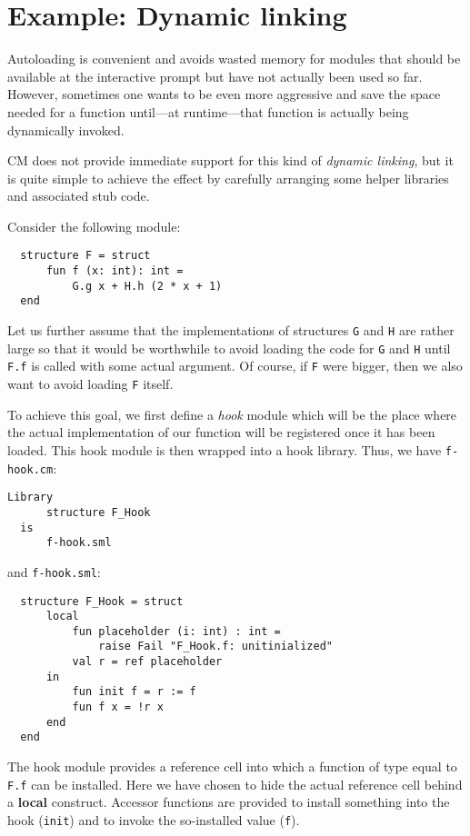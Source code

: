 %

\section{Example: Dynamic linking}
\label{sec:dynlink}

Autoloading is convenient and avoids wasted memory for modules that
should be available at the interactive prompt but have not actually
been used so far.  However, sometimes one wants to be even more
aggressive and save the space needed for a function until---at
runtime---that function is actually being dynamically invoked.

CM does not provide immediate support for this kind of {\em dynamic
linking}, but it is quite simple to achieve the effect by carefully
arranging some helper libraries and associated stub code.

Consider the following module:
\begin{lstlisting}
  structure F = struct
      fun f (x: int): int =
          G.g x + H.h (2 * x + 1)
  end
\end{lstlisting}%

Let us further assume that the implementations of structures {\tt G}
and {\tt H} are rather large so that it would be worthwhile to avoid
loading the code for {\tt G} and {\tt H} until {\tt F.f} is called
with some actual argument.  Of course, if {\tt F} were bigger, then we
also want to avoid loading {\tt F} itself.

To achieve this goal, we first define a {\em hook} module which will
be the place where the actual implementation of our function will be
registered once it has been loaded.  This hook module is then wrapped
into a hook library.  Thus, we have {\tt f-hook.cm}:
\begin{lstlisting}[language=CM]
  Library
      structure F_Hook
  is
      f-hook.sml
\end{lstlisting}%

and {\tt f-hook.sml}:

\begin{lstlisting}
  structure F_Hook = struct
      local
          fun placeholder (i: int) : int =
              raise Fail "F_Hook.f: unitinialized"
          val r = ref placeholder
      in
          fun init f = r := f
          fun f x = !r x
      end
  end
\end{lstlisting}%

The hook module provides a reference cell into which a function of
type equal to {\tt F.f} can be installed.  Here we have chosen to hide
the actual reference cell behind a {\bf local} construct.  Accessor
functions are provided to install something into the hook
({\tt init}) and to invoke the so-installed value ({\tt f}).

